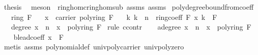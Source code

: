 \begin{isabellebody}
\ {\isacharquery}{\kern0pt}thesis\ \isamarkupfalse%
\ {\isacharparenleft}{\kern0pt}meson\ \ ring{\isacharunderscore}{\kern0pt}hom{\isacharunderscore}{\kern0pt}cring{\isachardot}{\kern0pt}hom{\isacharunderscore}{\kern0pt}sub\ assms{\isacharparenleft}{\kern0pt}{}{\isacharparenright}{\kern0pt}\ assms{\isacharparenleft}{\kern0pt}{}{\isacharparenright}{\kern0pt}{\isacharparenright}{\kern0pt}\isanewline
{}\isamarkupfalse%
%
\endisatagproof
{\isafoldproof}%
%
\isadelimproof
\isanewline
%
\endisadelimproof
\isanewline
{}\isamarkupfalse%
\ poly{\isacharunderscore}{\kern0pt}degree{\isacharunderscore}{\kern0pt}bound{\isacharunderscore}{\kern0pt}from{\isacharunderscore}{\kern0pt}coeff{\isacharcolon}{\kern0pt}\isanewline
\ \ \ {\isachardoublequoteopen}ring\ F{\isachardoublequoteclose}\isanewline
\ \ \ {\isachardoublequoteopen}x\ {\isasymin}\ carrier\ {\isacharparenleft}{\kern0pt}poly{\isacharunderscore}{\kern0pt}ring\ F{\isacharparenright}{\kern0pt}{\isachardoublequoteclose}\isanewline
\ \ \ {\isachardoublequoteopen}{\isasymAnd}k{\isachardot}{\kern0pt}\ k\ {\isasymge}\ n\ {\isasymLongrightarrow}\ ring{\isachardot}{\kern0pt}coeff\ F\ x\ k\ {\isacharequal}{\kern0pt}\ {\isasymzero}\isactrlbsub F\isactrlesub {\isachardoublequoteclose}\isanewline
\ \ \ {\isachardoublequoteopen}degree\ x\ {\isacharless}{\kern0pt}\ n\ {\isasymor}\ x\ {\isacharequal}{\kern0pt}\ {\isasymzero}\isactrlbsub poly{\isacharunderscore}{\kern0pt}ring\ F\isactrlesub {\isachardoublequoteclose}\isanewline
%
\isadelimproof
%
\endisadelimproof
%
\isatagproof
{}\isamarkupfalse%
\ {\isacharparenleft}{\kern0pt}rule\ ccontr{\isacharparenright}{\kern0pt}\isanewline
\ \ \isamarkupfalse%
\ a{\isacharcolon}{\kern0pt}{\isachardoublequoteopen}{\isasymnot}{\isacharparenleft}{\kern0pt}degree\ x\ {\isacharless}{\kern0pt}\ n\ {\isasymor}\ x\ {\isacharequal}{\kern0pt}\ {\isasymzero}\isactrlbsub poly{\isacharunderscore}{\kern0pt}ring\ F\isactrlesub {\isacharparenright}{\kern0pt}{\isachardoublequoteclose}\isanewline
\ \ \isamarkupfalse%
\ b{\isacharcolon}{\kern0pt}{\isachardoublequoteopen}lead{\isacharunderscore}{\kern0pt}coeff\ x\ {\isasymnoteq}\ {\isasymzero}\isactrlbsub F\isactrlesub {\isachardoublequoteclose}\ \isanewline
\ \ \ \ \isamarkupfalse%
\ {\isacharparenleft}{\kern0pt}metis\ assms{\isacharparenleft}{\kern0pt}{}{\isacharparenright}{\kern0pt}\ polynomial{\isacharunderscore}{\kern0pt}def\ univ{\isacharunderscore}{\kern0pt}poly{\isacharunderscore}{\kern0pt}carrier\ univ{\isacharunderscore}{\kern0pt}poly{\isacharunderscore}{\kern0pt}zero{\isacharparenright}{\kern0pt}\isanewline

\end{isabellebody}
